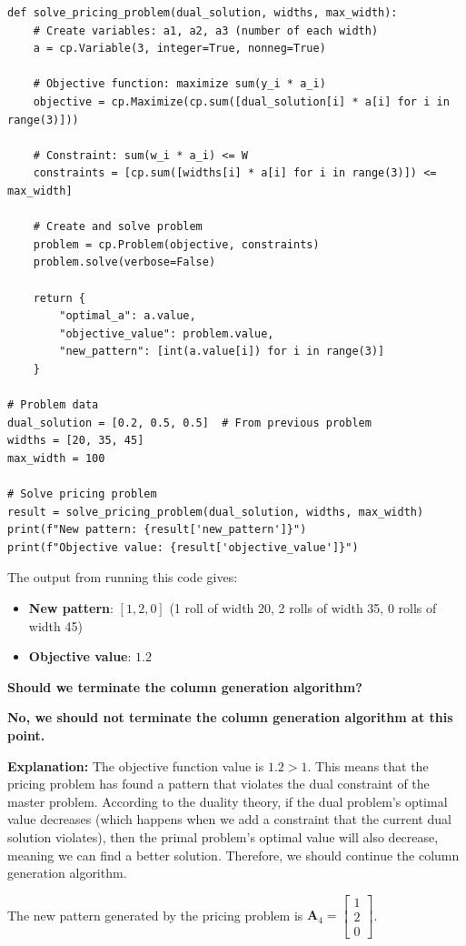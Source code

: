 \documentclass[11pt]{article}
\newcommand{\mb}[1]{\ensuremath{\boldsymbol{#1}}}
\begin{document}
\begin{enumerate}
\begin{enumerate}
\begin{verbatim}
def solve_pricing_problem(dual_solution, widths, max_width):
    # Create variables: a1, a2, a3 (number of each width)
    a = cp.Variable(3, integer=True, nonneg=True)
    
    # Objective function: maximize sum(y_i * a_i)
    objective = cp.Maximize(cp.sum([dual_solution[i] * a[i] for i in range(3)]))
    
    # Constraint: sum(w_i * a_i) <= W
    constraints = [cp.sum([widths[i] * a[i] for i in range(3)]) <= max_width]
    
    # Create and solve problem
    problem = cp.Problem(objective, constraints)
    problem.solve(verbose=False)
    
    return {
        "optimal_a": a.value,
        "objective_value": problem.value,
        "new_pattern": [int(a.value[i]) for i in range(3)]
    }

# Problem data
dual_solution = [0.2, 0.5, 0.5]  # From previous problem
widths = [20, 35, 45]
max_width = 100

# Solve pricing problem
result = solve_pricing_problem(dual_solution, widths, max_width)
print(f"New pattern: {result['new_pattern']}")
print(f"Objective value: {result['objective_value']}")
\end{verbatim}

The output from running this code gives:
\begin{itemize}
\item \textbf{New pattern}: $[1, 2, 0]$ (1 roll of width 20, 2 rolls of width 35, 0 rolls of width 45)
\item \textbf{Objective value}: $1.2$
\end{itemize}

\textbf{Should we terminate the column generation algorithm?}

\textbf{No, we should not terminate the column generation algorithm at this point.}

\textbf{Explanation:} The objective function value is $1.2 > 1$. This means that the pricing problem has found a pattern that violates the dual constraint of the master problem. According to the duality theory, if the dual problem's optimal value decreases (which happens when we add a constraint that the current dual solution violates), then the primal problem's optimal value will also decrease, meaning we can find a better solution. Therefore, we should continue the column generation algorithm.

The new pattern generated by the pricing problem is $\mb{A}_4 = \begin{bmatrix} 1 \\ 2 \\ 0 \end{bmatrix}$. 



\end{enumerate}
\end{enumerate}
\end{document}
